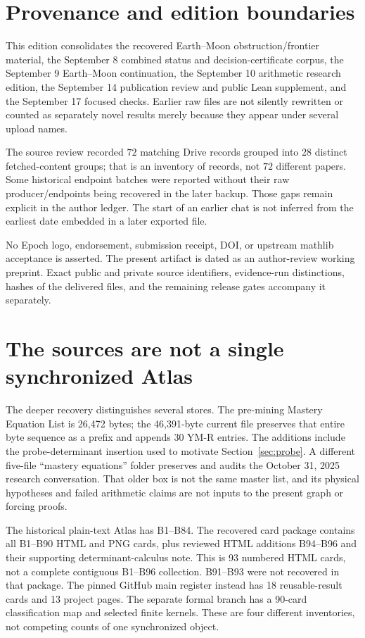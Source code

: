 \documentclass[11pt,letterpaper]{article}
\theoremstyle{definition}
\theoremstyle{remark}\newtheorem{remark}[theorem]{Remark}
\begin{document}
\section{Provenance and edition boundaries}
This edition consolidates the recovered Earth--Moon obstruction/frontier material, the September 8 combined status and decision-certificate corpus, the September 9 Earth--Moon continuation, the September 10 arithmetic research edition, the September 14 publication review and public Lean supplement, and the September 17 focused checks. Earlier raw files are not silently rewritten or counted as separately novel results merely because they appear under several upload names.

The source review recorded $72$ matching Drive records grouped into $28$ distinct fetched-content groups; that is an inventory of records, not $72$ different papers. Some historical endpoint batches were reported without their raw producer/endpoints being recovered in the later backup. Those gaps remain explicit in the author ledger. The start of an earlier chat is not inferred from the earliest date embedded in a later exported file.

No Epoch logo, endorsement, submission receipt, DOI, or upstream mathlib acceptance is asserted. The present artifact is dated as an author-review working preprint. Exact public and private source identifiers, evidence-run distinctions, hashes of the delivered files, and the remaining release gates accompany it separately.

\section{The sources are not a single synchronized Atlas}\label{app:reconciliation}
The deeper recovery distinguishes several stores. The pre-mining Mastery Equation List is 26,472 bytes; the 46,391-byte current file preserves that entire byte sequence as a prefix and appends 30 YM-R entries. The additions include the probe-determinant insertion used to motivate Section~\ref{sec:probe}. A different five-file ``mastery equations'' folder preserves and audits the October 31, 2025 research conversation. That older box is not the same master list, and its physical hypotheses and failed arithmetic claims are not inputs to the present graph or forcing proofs.

The historical plain-text Atlas has B1--B84. The recovered card package contains all B1--B90 HTML and PNG cards, plus reviewed HTML additions B94--B96 and their supporting determinant-calculus note. This is 93 numbered HTML cards, not a complete contiguous B1--B96 collection. B91--B93 were not recovered in that package. The pinned GitHub main register instead has 18 reusable-result cards and 13 project pages. The separate formal branch has a 90-card classification map and selected finite kernels. These are four different inventories, not competing counts of one synchronized object.
\end{document}
